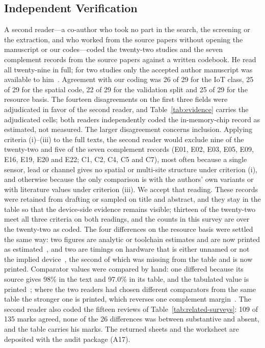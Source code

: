 \documentclass[journal]{IEEEtran}
\begin{document}
\subsection{Independent Verification}
\label{sec:verification}
A second reader---a co-author who took no part in the search, the screening or the extraction, and who worked from the source papers without opening the manuscript or our codes---coded the twenty-two studies and the seven complement records from the source papers against a written codebook. He read all twenty-nine in full; for two studies only the accepted author manuscript was available to him~\cite{Li2020GluNet,lin2022deep}. Agreement with our coding was 26 of 29 for the IoT class, 25 of 29 for the spatial code, 22 of 29 for the validation split and 25 of 29 for the resource basis. The fourteen disagreements on the first three fields were adjudicated in favor of the second reader, and Table~\ref{tab:evidence} carries the adjudicated cells; both readers independently coded the in-memory-chip record as estimated, not measured. The larger disagreement concerns inclusion. Applying criteria (i)--(iii) to the full texts, the second reader would exclude nine of the twenty-two and five of the seven complement records (E01, E02, E03, E05, E09, E16, E19, E20 and E22; C1, C2, C4, C5 and C7), most often because a single sensor, lead or channel gives no spatial or multi-site structure under criterion (i), and otherwise because the only comparison is with the authors' own variants or with literature values under criterion (iii). We accept that reading. These records were retained from drafting or sampled on title and abstract, and they stay in the table so that the device-side evidence remains visible; thirteen of the twenty-two meet all three criteria on both readings, and the counts in this survey are over the twenty-two as coded. The four differences on the resource basis were settled the same way: two figures are analytic or toolchain estimates and are now printed as estimated~\cite{verbiest2023gaitstride,chu2021neuromorphicecg}, and two are timings on hardware that is either unnamed or not the implied device~\cite{huynh2026afdetect,Kyritsis2019EatingBehavior}, the second of which was missing from the table and is now printed. Comparator values were compared by hand: one differed because its source gives 98\% in the text and 97.0\% in its table, and the tabulated value is printed~\cite{bhatti2025falls}; where the two readers had chosen different comparators from the same table the stronger one is printed, which reverses one complement margin~\cite{chu2021neuromorphicecg}. The second reader also coded the fifteen reviews of Table~\ref{tab:related-surveys}: 109 of 135 marks agreed, none of the 26 differences was between substantive and absent, and the table carries his marks. The returned sheets and the worksheet are deposited with the audit package (A17).
\end{document}
